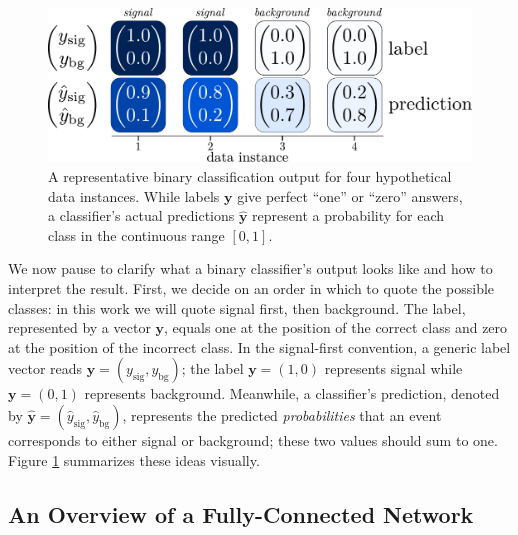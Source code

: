 \documentclass[11pt, a4paper]{article}
\renewcommand{\vec}[1]{\bm{#1}}
\newcommand{\y}{\vec{y}}
\begin{document}
\begin{figure}[htb!]
    \centering
    \includegraphics[width=0.85\linewidth]{vector/binary-output.pdf}
    \caption{A representative binary classification output for four hypothetical data instances. While labels $ \y $ give perfect ``one'' or ``zero'' answers, a classifier's actual predictions $ \hat{\y} $ represent a probability for each class in the continuous range $ [0, 1] $.}
    \label{fig:output}
\end{figure}

We now pause to clarify what a binary classifier's output looks like and how to interpret the result. First, we decide on an order in which to quote the possible classes: in this work we will quote signal first, then background. The label, represented by a vector $ \vec{y} $, equals one at the position of the correct class and zero at the position of the incorrect class. In the signal-first convention, a generic label vector reads $ \vec{y} = (y_{\text{sig}}, y_{\text{bg}}) $; the label $ \vec{y} = (1, 0) $ represents signal while $ \vec{y} = (0, 1) $ represents background. Meanwhile, a classifier's prediction, denoted by $ \hat{\y} = (\hat{y}_{\text{sig}}, \hat{y}_{\text{bg}})$, represents the predicted \textit{probabilities} that an event corresponds to either signal or background; these two values should sum to one. Figure \ref{fig:output} summarizes these ideas visually.


\subsection{An Overview of a Fully-Connected Network} \label{ss:fcn-first-look}
\end{document}
